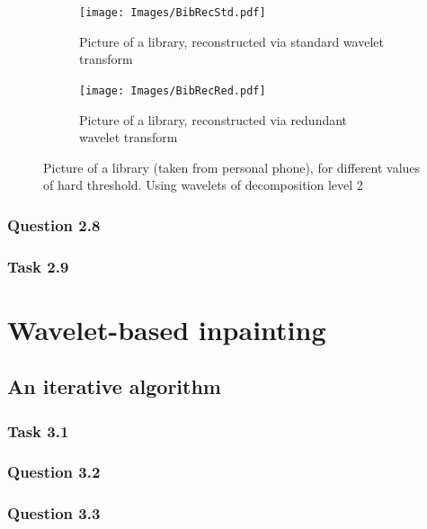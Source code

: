 \documentclass[a4paper]{article}
\begin{document}
\begin{figure}[H]
	\centering
	\begin{subfigure}{0.49\textwidth}
		\centering
		\texttt{[image: Images/BibRecStd.pdf]}
		\caption{Picture of a library, reconstructed via standard wavelet transform}
		\label{sub:RecStd}
	\end{subfigure}
	\begin{subfigure}{0.49\textwidth}
		\centering
		\texttt{[image: Images/BibRecRed.pdf]}
		\caption{Picture of a library, reconstructed via redundant wavelet transform}
		\label{sub:RecRed}
	\end{subfigure}
	\caption{Picture of a library (taken from personal phone), for different values of hard threshold. Using wavelets of decomposition level 2}
	\label{fig:Rec}
\end{figure}

    \subsubsection{Question 2.8}

    \subsubsection{Task 2.9}

	\newpage
	
    \section{Wavelet-based inpainting}

    \subsection{An iterative algorithm}

    \subsubsection{Task 3.1}

    \subsubsection{Question 3.2}

    \subsubsection{Question 3.3}
\end{document}
